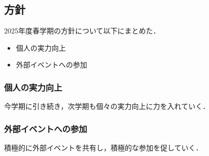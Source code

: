 \subsection*{\newGradeIfKouki{}\secondGrade{}方針}


2025年度春学期の\secondGrade{}方針について以下にまとめた．

\begin{itemize}
    \item 個人の実力向上
    \item 外部イベントへの参加
\end{itemize}

\subsubsection*{個人の実力向上}
今学期に引き続き，次学期も個々の実力向上に力を入れていく．

\subsubsection*{外部イベントへの参加}
積極的に外部イベントを共有し，積極的な参加を促していく．
